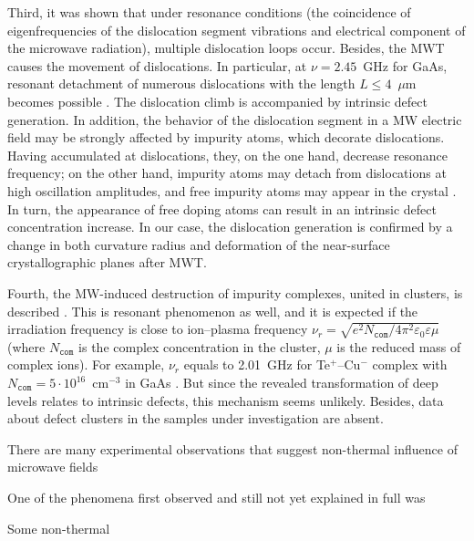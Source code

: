 \documentclass[10pt]{iopart}
\begin{document}
Third, it was shown \cite{MWT:JLumin,Konakova2007JTFEn,Milenin:SPQEO2019} that under resonance conditions
(the coincidence of eigenfrequencies of the dislocation segment vibrations and electrical component of the microwave radiation),
multiple dislocation loops occur.
Besides, the MWT causes the  movement of dislocations.
In particular, at $\nu=2.45$~GHz for GaAs, resonant detachment
of numerous dislocations with the length $L\leq4$~$\mu$m becomes possible \cite{Milenin:SPQEO2019}.
The dislocation climb is accompanied by intrinsic defect generation.
In addition, the behavior of the dislocation segment in a MW electric field may be strongly affected by
impurity atoms, which decorate dislocations.
Having accumulated at dislocations, they, on the one hand,
decrease resonance frequency;
on the other hand, impurity atoms may detach from dislocations at
high oscillation amplitudes, and free impurity atoms may appear in the crystal \cite{MWT:JLumin,Konakova2007JTFEn}.
In turn, the appearance of free doping atoms can result in an intrinsic defect concentration increase.
In our case, the dislocation generation is confirmed by a change in both curvature radius and
deformation of the near-surface crystallographic planes after MWT.

Fourth, the MW-induced destruction of impurity complexes, united in clusters,
is described \cite{MWT:JLumin,Konakova2007JTFEn,Milenin:SPQEO2019}.
This is resonant phenomenon as well, and it is expected if the
irradiation frequency is close to ion--plasma frequency
$\nu_r=\sqrt{e^2N_\mathtt{com}/4\pi^2\varepsilon_0\varepsilon\mu}$
(where
$N_\mathtt{com}$ is the complex concentration in the cluster,
$\mu$ is the reduced mass of complex ions).
For example, $\nu_r$ equals to 2.01~GHz for
Te$^+$--Cu$^-$ complex with $N_\mathtt{com}=5\cdot10^{16}$~cm$^{-3}$
in GaAs \cite{MWT:JLumin}.
But since the revealed transformation of deep levels
relates to intrinsic defects, this mechanism seems unlikely.
Besides, data about defect clusters in the samples under investigation are absent.




There are many experimental observations that suggest
non-thermal influence of microwave fields \cite{MW:Si2018,MWT:Rew2001}

One of the phenomena first observed and still not yet explained
in full was

Some non-thermal




\cite{Milenin:SPQEO2020,MW:Force,Milenin:SPQEO2019,MWT:PandForce97,MWT:PandForce92,LightNeuIrrad:1,LightNeuIrrad:2}
\end{document}
